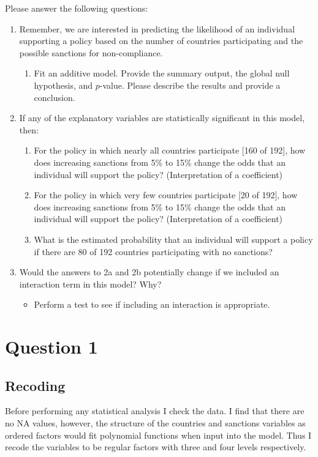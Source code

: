 \documentclass[12pt,letterpaper]{article}
\begin{document}
\newpage
\noindent Please answer the following questions:

\begin{enumerate}
	\item
	Remember, we are interested in predicting the likelihood of an individual supporting a policy based on the number of countries participating and the possible sanctions for non-compliance.
	\begin{enumerate}
		\item [] Fit an additive model. Provide the summary output, the global null hypothesis, and $p$-value. Please describe the results and provide a conclusion.

	\end{enumerate}
	
	\item
	If any of the explanatory variables are statistically significant in this model, then:
	\begin{enumerate}
		\item
		For the policy in which nearly all countries participate [160 of 192], how does increasing sanctions from 5\% to 15\% change the odds that an individual will support the policy? (Interpretation of a coefficient)
		\item
		For the policy in which very few countries participate [20 of 192], how does increasing sanctions from 5\% to 15\% change the odds that an individual will support the policy? (Interpretation of a coefficient)
		\item
		What is the estimated probability that an individual will support a policy if there are 80 of 192 countries participating with no sanctions? 
	
	\end{enumerate}
	\item
	Would the answers to 2a and 2b potentially change if we included an interaction term in this model? Why? 
	\begin{itemize}
		\item Perform a test to see if including an interaction is appropriate.
	\end{itemize}
	\end{enumerate}

\newpage

\section{Question 1}

\subsection{Recoding}
Before performing any statistical analysis I check the data. I find that there are no NA values, however, the structure of the countries and sanctions variables as ordered factors would fit polynomial functions when input into the model. Thus I recode the variables to be regular factors with three and four levels respectively. 
\end{document}
